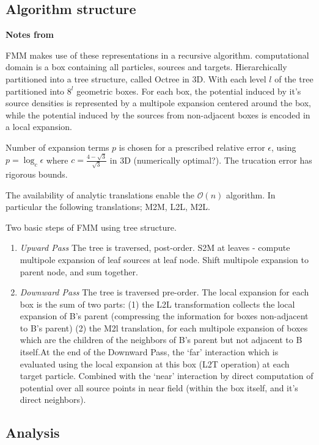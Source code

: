 \subsection{Algorithm structure}

\textbf{Notes from \cite{Ying:2004:JCP}}

FMM makes use of these representations in a recursive algorithm. computational
domain is a box containing all particles, sources and targets. Hierarchically
partitioned into a tree structure, called Octree in 3D. With each level $l$ of the
tree partitioned into $8^l$ geometric boxes. For each box, the potential induced
by it's source densities is represented by a multipole expansion centered around
the box, while the potential induced by the sources from non-adjacent boxes is
encoded in a local expansion.

Number of expansion terms $p$ is chosen for a prescribed relative error $\epsilon$,
using $p=\log_c \epsilon$ where $c=\frac{4-\sqrt{3}}{\sqrt{3}}$ in 3D (numerically optimal?).
The trucation error has rigorous bounds.

The availability of analytic translations enable the $\mathcal{O}(n)$ algorithm.
In particular the following translations; M2M, L2L, M2L.

Two basic steps of FMM using tree structure.

\begin{enumerate}
    \item \textit{Upward Pass} The tree is traversed, post-order. S2M at leaves
    - compute multipole expansion of leaf sources at leaf node. Shift multipole
    expansion to parent node, and sum together.
    \item \textit{Downward Pass} The tree is traversed pre-order. The local expansion
    for each box is the sum of two parts: (1) the L2L transformation collects the local
    expansion of B's parent (compressing the information for boxes non-adjacent to B's parent)
    (2) the M2l translation, for each multipole expansion of boxes which are the children of
    the neighbors of B's parent but not adjacent to B itself.At the end of the
    Downward Pass, the `far' interaction which is evaluated
    using the local expansion at this box (L2T operation) at each target particle.
    Combined with the `near' interaction by direct computation of potential over all
    source points in near field (within the box itself, and it's direct neighbors).
\end{enumerate}


\subsection{Analysis}


